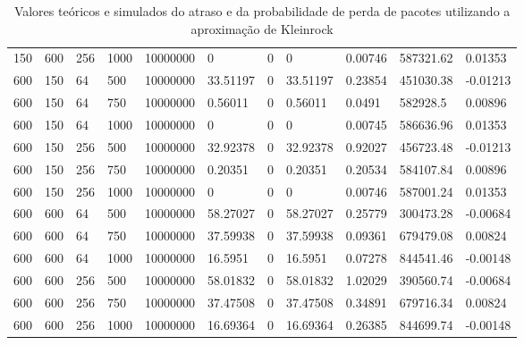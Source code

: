 \documentclass[pdftex,12pt,a4paper]{report}
\begin{document}
\begin{table}[!htb]
{\begin{tabular}{lllllllllll}
150      & 600      & 256       & 1000 & 10000000 & 0                      & 0                      & 0                & 0.00746       & 587321.62             & 0.01353  \\
600      & 150      & 64        & 500  & 10000000 & 33.51197               & 0                      & 33.51197         & 0.23854       & 451030.38             & -0.01213 \\
600      & 150      & 64        & 750  & 10000000 & 0.56011                & 0                      & 0.56011          & 0.0491        & 582928.5              & 0.00896  \\
600      & 150      & 64        & 1000 & 10000000 & 0                      & 0                      & 0                & 0.00745       & 586636.96             & 0.01353  \\
600      & 150      & 256       & 500  & 10000000 & 32.92378               & 0                      & 32.92378         & 0.92027       & 456723.48             & -0.01213 \\
600      & 150      & 256       & 750  & 10000000 & 0.20351                & 0                      & 0.20351          & 0.20534       & 584107.84             & 0.00896  \\
600      & 150      & 256       & 1000 & 10000000 & 0                      & 0                      & 0                & 0.00746       & 587001.24             & 0.01353  \\
600      & 600      & 64        & 500  & 10000000 & 58.27027               & 0                      & 58.27027         & 0.25779       & 300473.28             & -0.00684 \\
600      & 600      & 64        & 750  & 10000000 & 37.59938               & 0                      & 37.59938         & 0.09361       & 679479.08             & 0.00824  \\
600      & 600      & 64        & 1000 & 10000000 & 16.5951                & 0                      & 16.5951          & 0.07278       & 844541.46             & -0.00148 \\
600      & 600      & 256       & 500  & 10000000 & 58.01832               & 0                      & 58.01832         & 1.02029       & 390560.74             & -0.00684 \\
600      & 600      & 256       & 750  & 10000000 & 37.47508               & 0                      & 37.47508         & 0.34891       & 679716.34             & 0.00824  \\
600      & 600      & 256       & 1000 & 10000000 & 16.69364               & 0                      & 16.69364         & 0.26385       & 844699.74             & -0.00148
\end{tabular}}
\caption[]{Valores teóricos e simulados do atraso e da probabilidade de perda de pacotes utilizando a aproximação de Kleinrock \footnotemark}
\end{table}
\end{document}
